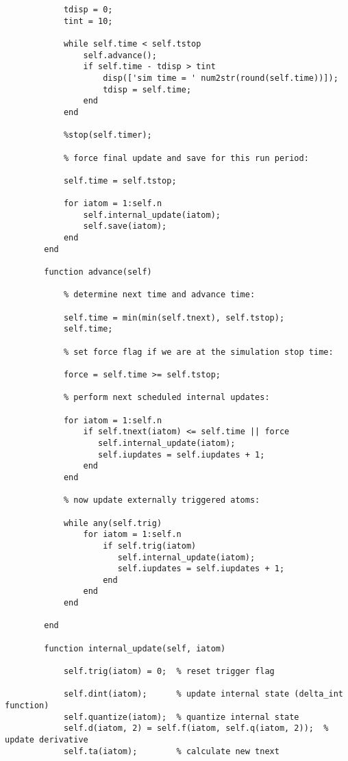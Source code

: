 \begin{lstlisting}
            tdisp = 0;
            tint = 10;
            
            while self.time < self.tstop
                self.advance();   
                if self.time - tdisp > tint
                    disp(['sim time = ' num2str(round(self.time))]);
                    tdisp = self.time;
                end
            end
            
            %stop(self.timer);
            
            % force final update and save for this run period:
            
            self.time = self.tstop;
            
            for iatom = 1:self.n
                self.internal_update(iatom);
                self.save(iatom);
            end 
        end
        
        function advance(self)
            
            % determine next time and advance time:
             
            self.time = min(min(self.tnext), self.tstop);
            self.time;

            % set force flag if we are at the simulation stop time:
            
            force = self.time >= self.tstop;
            
            % perform next scheduled internal updates:

            for iatom = 1:self.n
                if self.tnext(iatom) <= self.time || force
                   self.internal_update(iatom);
                   self.iupdates = self.iupdates + 1;
                end
            end  
            
            % now update externally triggered atoms:
            
            while any(self.trig)
                for iatom = 1:self.n
                    if self.trig(iatom)
                       self.internal_update(iatom);
                       self.iupdates = self.iupdates + 1;
                    end
                end 
            end

        end
        
        function internal_update(self, iatom)   
            
            self.trig(iatom) = 0;  % reset trigger flag
            
            self.dint(iatom);      % update internal state (delta_int function)
            self.quantize(iatom);  % quantize internal state
            self.d(iatom, 2) = self.f(iatom, self.q(iatom, 2));  % update derivative 
            self.ta(iatom);        % calculate new tnext


\end{lstlisting}
